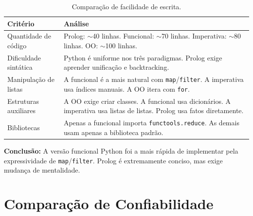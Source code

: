 \documentclass[12pt, a4paper]{article}
\begin{document}
\begin{table}[h]
\centering
\begin{tabularx}{\textwidth}{lX}
\toprule
\textbf{Critério} & \textbf{Análise} \\
\midrule
Quantidade de código & Prolog: $\sim$40 linhas. Funcional: $\sim$70 linhas. Imperativa: $\sim$80 linhas. OO: $\sim$100 linhas. \\
\addlinespace
Dificuldade sintática & Python é uniforme nos três paradigmas. Prolog exige aprender unificação e backtracking. \\
\addlinespace
Manipulação de listas & A funcional é a mais natural com \texttt{map}/\texttt{filter}. A imperativa usa índices manuais. A OO itera com \texttt{for}. \\
\addlinespace
Estruturas auxiliares & A OO exige criar classes. A funcional usa dicionários. A imperativa usa listas de listas. Prolog usa fatos diretamente. \\
\addlinespace
Bibliotecas & Apenas a funcional importa \texttt{functools.reduce}. As demais usam apenas a biblioteca padrão. \\
\bottomrule
\end{tabularx}
\caption{Comparação de facilidade de escrita.}
\end{table}

\textbf{Conclusão:} A versão funcional Python foi a mais rápida de implementar pela expressividade de \texttt{map}/\texttt{filter}. Prolog é extremamente conciso, mas exige mudança de mentalidade.

\section{Comparação de Confiabilidade}
\end{document}
